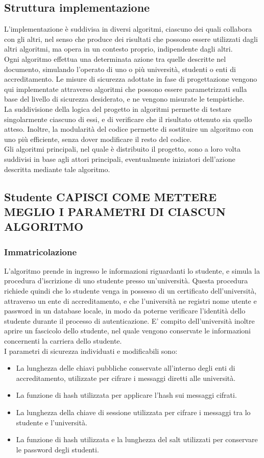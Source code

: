 \documentclass[a4paper,12pt]{article}
\begin{document}
\subsection{Struttura implementazione}
L'implementazione è suddivisa in diversi algoritmi, ciascuno dei quali collabora con gli altri, nel senso che produce dei risultati che possono essere utilizzati dagli altri algoritmi, ma opera in un contesto proprio, indipendente dagli altri.
\\[1em]
Ogni algoritmo effettua una determinata azione tra quelle descritte nel documento, simulando l'operato di uno o più università, studenti o enti di accreditamento. Le misure di sicurezza adottate in fase di progettazione vengono qui implementate attraverso algoritmi che possono essere parametrizzati sulla base del livello di sicurezza desiderato, e ne vengono misurate le tempistiche.
\\
La suddivisione della logica del progetto in algoritmi permette di testare singolarmente ciascuno di essi, e di verificare che il risultato ottenuto sia quello atteso. Inoltre, la modularità del codice permette di sostituire un algoritmo con uno più efficiente, senza dover modificare il resto del codice.
\\[1em] Gli algoritmi principali, nel quale è distribuito il progetto, sono a loro volta suddivisi in base agli attori principali, eventualmente iniziatori dell'azione descritta mediante tale algoritmo.
\subsection{Studente CAPISCI COME METTERE MEGLIO I PARAMETRI DI CIASCUN ALGORITMO}
\subsubsection{Immatricolazione}
L'algoritmo prende in ingresso le informazioni riguardanti lo studente, e simula la procedura d'iscrizione di uno studente presso un'università. Questa procedura richiede quindi che lo studente venga in possesso di un certificato dell'università, attraverso un ente di accreditamento, e che l'università ne registri nome utente e password in un database locale, in modo da poterne verificare l'identità dello studente durante il processo di autenticazione. E' compito dell'università inoltre aprire un fascicolo dello studente, nel quale vengono conservate le informazioni concernenti la carriera dello studente.
\\
I parametri di sicurezza individuati e modificabili sono:
\begin{itemize}
    \item La lunghezza delle chiavi pubbliche conservate all'interno degli enti di accreditamento, utilizzate per cifrare i messaggi diretti alle università.
    \item La funzione di hash utilizzata per applicare l'hash sui messaggi cifrati.
    \item La lunghezza della chiave di sessione utilizzata per cifrare i messaggi tra lo studente e l'università.
    \item La funzione di hash utilizzata e la lunghezza del salt utilizzati per conservare le password degli studenti.
    \end{itemize}
\end{document}
